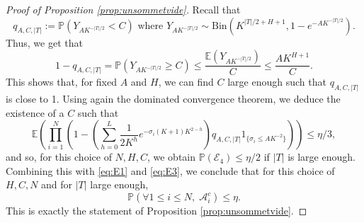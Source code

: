 \documentclass[10pt,a4paper]{amsart}
\newcommand{\E}{\mathbb{E}}
\newcommand{\Tf}{T}
\renewcommand{\P}{\mathbb{P}}
\begin{document}
\begin{proof}[Proof of Proposition \ref{prop:unsommetvide}]
Recall that 
$$q_{A,C,|\Tf|}:=\P(Y_{A K^{-|\Tf|/2}}<C) \mbox{ where } Y_{A K^{-|\Tf|/2}}\sim \mbox{Bin}(K^{|\Tf|/2+H+1}, 1-e^{-A K^{-|\Tf|/2}}).$$
Thus, we get that
$$1-q_{A,C,|\Tf|}=\P(Y_{A K^{-|\Tf|/2}}\ge C)\le \frac{\E(Y_{A K^{-|\Tf|/2}})}{C}\le \frac{A K^{H+1}}{C}.$$
This shows that, for fixed $A$ and $H$, we can find $C$ large enough such that $q_{A,C,|\Tf|}$ is close to 1. Using again the dominated convergence theorem, we deduce the existence of a $C$ such that 
$$\E\left(\prod_{i=1}^N \left(1-\left(\sum_{h=0}^L\frac{1}{2K^h}e^{-\sigma_i(K+1)K^{2-h}}\right) q_{A,C,|\Tf|}1_{\{\sigma_i\le A K^{-2}\}}
\right)\right)\le \eta/3,$$
and so, for this choice of $N,H,C$, we obtain $\P(\mathcal{E}_4)\le \eta/2$ if $|\Tf|$ is large enough. Combining this with \eqref{eq:E1} and \eqref{eq:E3}, we conclude that for this choice of $H,C,N$ and for $|\Tf|$ large enough,
\begin{equation*}
 \P(\forall 1\le i\le N,\; \mathcal{A}_i^c)\le \eta.
\end{equation*}
This is exactly the statement of Proposition \ref{prop:unsommetvide}.
\end{proof}
\end{document}
